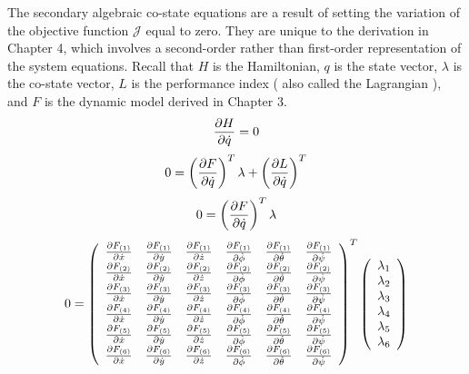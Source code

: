The secondary algebraic co-state equations are a result of setting the variation of  the objective function $\mathcal{  J  }$ equal to zero. They are unique to the derivation in Chapter 4, which involves a second-order rather than first-order representation of the system equations. Recall that $H$ is the Hamiltonian, $q$ is the state vector, $\lambda$ is the co-state vector, $L$ is the performance index ( also called the Lagrangian ), and $F$ is the dynamic model derived in Chapter 3.
\begin{equation}
    \frac{\partial H}{\partial \dot q} = 0
\end{equation}
\begin{equation}
0 = \left(\frac{\partial F}{\partial \dot q}\right)^T \lambda + \left(\frac{\partial L}{\partial \dot q}\right)^T
\end{equation}
\begin{equation}
    0 = \left(\frac{\partial F}{\partial \dot q}\right)^T \lambda
\end{equation}
\begin{equation}
    0 = \left(
    \begin{array}{c c c c c c}
    \frac{\partial F_{(1)}}{\partial \dot x} & \frac{\partial F_{(1)}}{\partial \dot y} & \frac{\partial F_{(1)}}{\partial \dot z} & \frac{\partial F_{(1)}}{\partial \dot \phi} & \frac{\partial F_{(1)}}{\partial \dot \theta} & \frac{\partial F_{(1)}}{\partial \dot \psi}\\
    \frac{\partial F_{(2)}}{\partial \dot x} & \frac{\partial F_{(2)}}{\partial \dot y} & \frac{\partial F_{(2)}}{\partial \dot z} & \frac{\partial F_{(2)}}{\partial \dot \phi} & \frac{\partial F_{(2)}}{\partial \dot \theta} & \frac{\partial F_{(2)}}{\partial \dot \psi}\\
    \frac{\partial F_{(3)}}{\partial \dot x} & \frac{\partial F_{(3)}}{\partial \dot y} & \frac{\partial F_{(3)}}{\partial \dot z} & \frac{\partial F_{(3)}}{\partial \dot \phi} & \frac{\partial F_{(3)}}{\partial \dot \theta} & \frac{\partial F_{(3)}}{\partial \dot \psi}\\
    \frac{\partial F_{(4)}}{\partial \dot x} & \frac{\partial F_{(4)}}{\partial \dot y} & \frac{\partial F_{(4)}}{\partial \dot z} & \frac{\partial F_{(4)}}{\partial \dot \phi} & \frac{\partial F_{(4)}}{\partial \dot \theta} & \frac{\partial F_{(4)}}{\partial \dot \psi}\\
    \frac{\partial F_{(5)}}{\partial \dot x} & \frac{\partial F_{(5)}}{\partial \dot y} & \frac{\partial F_{(5)}}{\partial \dot z} & \frac{\partial F_{(5)}}{\partial \dot \phi} & \frac{\partial F_{(5)}}{\partial \dot \theta} & \frac{\partial F_{(5)}}{\partial \dot \psi}\\
    \frac{\partial F_{(6)}}{\partial \dot x} & \frac{\partial F_{(6)}}{\partial \dot y} & \frac{\partial F_{(6)}}{\partial \dot z} & \frac{\partial F_{(6)}}{\partial \dot \phi} & \frac{\partial F_{(6)}}{\partial \dot \theta} & \frac{\partial F_{(6)}}{\partial \dot \psi}\\
    \end{array}\right)^T\left(
    \begin{array}{c}
    \lambda_1\\
    \lambda_2\\
    \lambda_3\\
    \lambda_4\\
    \lambda_5\\
    \lambda_6\\
    \end{array}\right)
\end{equation}

